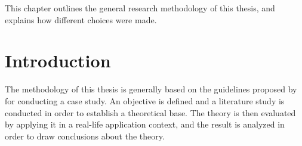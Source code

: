 
This chapter outlines the general research methodology of this thesis,
and explains how different choices were made.\\

\section{Introduction}
The methodology of this thesis is generally based on the guidelines
proposed by \citet{article:casestudies} for conducting a case study.
An objective is defined and a literature study is conducted in
order to establish a theoretical base. The theory is then evaluated by
applying it in a real-life application context, and the result is
analyzed in order to draw conclusions about the theory.

